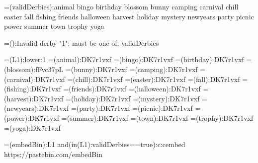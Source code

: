 {=(validDerbies):animal bingo birthday blossom bunny camping carnival chill easter fall fishing friends halloween harvest holiday mystery newyears party picnic power summer town trophy yoga}

{=():Invalid derby "{1}"; must be one of: {validDerbies}}

{=(L1):{lower:{1}}}
{=(animal):DK7r1vxf}
{=(bingo):DK7r1vxf}
{=(birthday):DK7r1vxf}
{=(blossom):fFvc37pL}
{=(bunny):DK7r1vxf}
{=(camping):DK7r1vxf}
{=(carnival):DK7r1vxf}
{=(chill):DK7r1vxf}
{=(easter):DK7r1vxf}
{=(fall):DK7r1vxf}
{=(fishing):DK7r1vxf}
{=(friends):DK7r1vxf}
{=(halloween):DK7r1vxf}
{=(harvest):DK7r1vxf}
{=(holiday):DK7r1vxf}
{=(mystery):DK7r1vxf}
{=(newyears):DK7r1vxf}
{=(party):DK7r1vxf}
{=(picnic):DK7r1vxf}
{=(power):DK7r1vxf}
{=(summer):DK7r1vxf}
{=(town):DK7r1vxf}
{=(trophy):DK7r1vxf}
{=(yoga):DK7r1vxf}

{=(embedBin):{{L1}}}
{{and({in({L1}):{validDerbies}}==true):c:cembed https://pastebin.com/{embedBin}}}